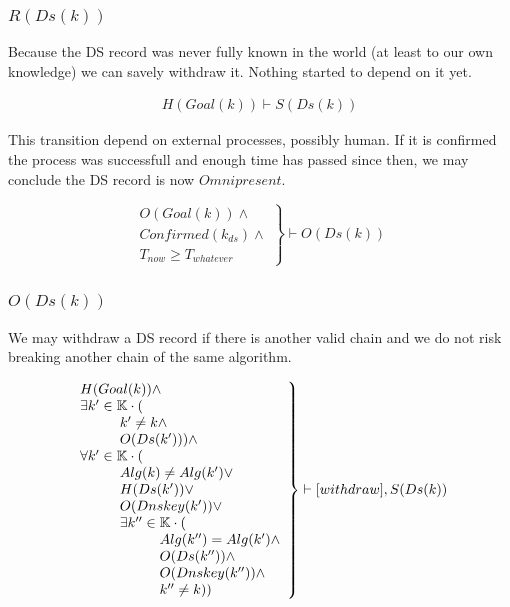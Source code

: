 \documentclass[twoside,english, a4paper]{article}
\newcommand{\mathbox}[1]{#1}
\begin{document}
\subsubsection{$R(Ds(k))$}

\mathbox{
	
	Because the DS record was never fully known in the world (at 
	least to our own knowledge) we can savely withdraw it. Nothing 
	started to depend on it yet.
	
	\begin{equation}
		\begin{split}
			H(Goal(k)) \vdash S(Ds(k))
		\end{split}
	\end{equation}

	This transition depend on external processes, possibly human. If it 
	is confirmed the process was successfull and enough time has passed
	since then, we may conclude the DS record is now $Omnipresent$.
	
	\begin{equation}
		\left.
		\begin{array}{l}
			O(Goal(k)) \wedge \\
			Confirmed(k_{ds}) \wedge \\
			T_{now} \geq T_{whatever}
		\end{array}
		\right\}\vdash O(Ds(k))
	\end{equation}
}

\subsubsection{$O(Ds(k))$}

\mathbox{

	We may withdraw a DS record if there is another valid chain and
	we do not risk breaking another chain of the same algorithm.

	\begin{equation}
		\left.
		\begin{array}{l}
\hskip 0cm			H(Goal(k)) \wedge \\
\hskip 0cm			\exists k' \in \mathbb{K} \cdot (\\
\hskip 1cm				k' \neq k \wedge \\
\hskip 1cm				O(Ds(k'))) \wedge \\
\hskip 0cm				\forall k' \in \mathbb{K} \cdot ( \\
\hskip 1cm					Alg(k) \neq Alg(k') \vee \\
\hskip 1cm					H(Ds(k')) \vee \\
\hskip 1cm					O(Dnskey(k')) \vee \\
\hskip 1cm					\exists k'' \in \mathbb{K} \cdot (\\
\hskip 2cm 						Alg(k'')=Alg(k') \wedge \\
\hskip 2cm 						O(Ds(k'')) \wedge \\
\hskip 2cm 						O(Dnskey(k'')) \wedge \\
\hskip 2cm 						k'' \neq k))
		\end{array}
		\right\} \vdash [withdraw], S(Ds(k)) \\
	\end{equation}
}
\end{document}
